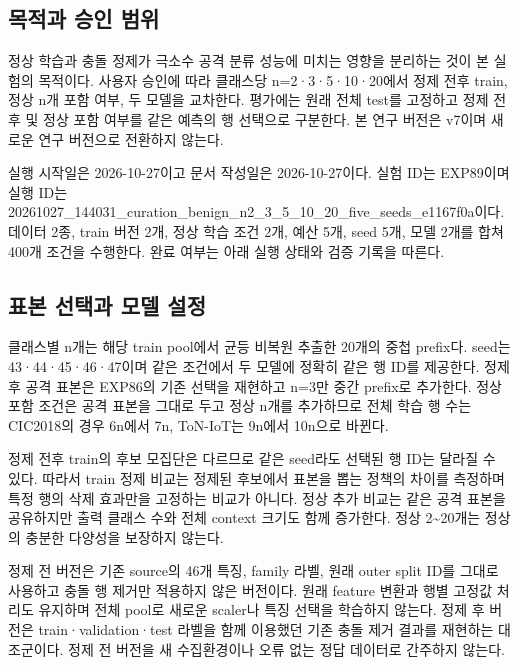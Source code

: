 

\subsection{목적과 승인 범위}
정상 학습과 충돌 정제가 극소수 공격 분류 성능에 미치는 영향을 분리하는 것이 본 실험의 목적이다. 사용자 승인에 따라 클래스당 n=\allowbreak{}2·3·5·10·20에서 정제 전후 train, 정상 n개 포함 여부, 두 모델을 교차한다. 평가에는 원래 전체 test를 고정하고 정제 전후 및 정상 포함 여부를 같은 예측의 행 선택으로 구분한다. 본 연구 버전은 v7이며 새로운 연구 버전으로 전환하지 않는다.

실행 시작일은 2026-10-27이고 문서 작성일은 2026-10-27이다. 실험 ID는 EXP89이며 실행 ID는 20261027\_\allowbreak{}144031\_\allowbreak{}curation\_\allowbreak{}benign\_\allowbreak{}n2\_\allowbreak{}3\_\allowbreak{}5\_\allowbreak{}10\_\allowbreak{}20\_\allowbreak{}five\_\allowbreak{}seeds\_\allowbreak{}e1167f0a이다. 데이터 2종, train 버전 2개, 정상 학습 조건 2개, 예산 5개, seed 5개, 모델 2개를 합쳐 400개 조건을 수행한다. 완료 여부는 아래 실행 상태와 검증 기록을 따른다.

\subsection{표본 선택과 모델 설정}
클래스별 n개는 해당 train pool에서 균등 비복원 추출한 20개의 중첩 prefix다. seed는 43·44·45·46·47이며 같은 조건에서 두 모델에 정확히 같은 행 ID를 제공한다. 정제 후 공격 표본은 EXP86의 기존 선택을 재현하고 n=\allowbreak{}3만 중간 prefix로 추가한다. 정상 포함 조건은 공격 표본을 그대로 두고 정상 n개를 추가하므로 전체 학습 행 수는 CIC2018의 경우 6n에서 7n, ToN-IoT는 9n에서 10n으로 바뀐다.

정제 전후 train의 후보 모집단은 다르므로 같은 seed라도 선택된 행 ID는 달라질 수 있다. 따라서 train 정제 비교는 정제된 후보에서 표본을 뽑는 정책의 차이를 측정하며 특정 행의 삭제 효과만을 고정하는 비교가 아니다. 정상 추가 비교는 같은 공격 표본을 공유하지만 출력 클래스 수와 전체 context 크기도 함께 증가한다. 정상 2\textasciitilde{}20개는 정상의 충분한 다양성을 보장하지 않는다.

정제 전 버전은 기존 source의 46개 특징, family 라벨, 원래 outer split ID를 그대로 사용하고 충돌 행 제거만 적용하지 않은 버전이다. 원래 feature 변환과 행별 고정값 처리도 유지하며 전체 pool로 새로운 scaler나 특징 선택을 학습하지 않는다. 정제 후 버전은 train·validation·test 라벨을 함께 이용했던 기존 충돌 제거 결과를 재현하는 대조군이다. 정제 전 버전을 새 수집환경이나 오류 없는 정답 데이터로 간주하지 않는다.

